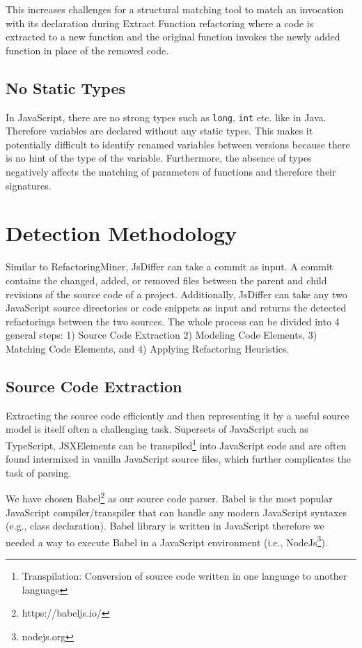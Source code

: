 \documentclass[letterpaper,12pt,onecolumn,final]{report}
\begin{document}
This increases challenges for a structural matching tool to match an invocation with its declaration during Extract Function refactoring where a code is extracted to a new function and the original function invokes the newly added function in place of the removed code.


\subsection {No Static Types}

In JavaScript, there are no strong types such as \texttt{long}, \texttt{int} etc. like in Java. Therefore variables are declared without any static types. This makes it potentially difficult to identify renamed variables between versions because there is no hint of the type of the variable. Furthermore, the absence of types negatively affects the matching of parameters of functions and therefore their signatures.

\section {Detection Methodology}

Similar to RefactoringMiner, JsDiffer can take a commit as input. A commit contains the changed, added, or removed files between the parent and child revisions of the source code of a project. Additionally, JsDiffer can take any two JavaScript source directories or code snippets as input and returns the detected refactorings between the two sources. The whole process can be divided into 4 general steps: 1) Source Code Extraction 2) Modeling Code Elements, 3) Matching Code Elements, and 4) Applying Refactoring Heuristics.


\subsection {Source Code Extraction}
Extracting the source code efficiently and then representing it by a useful source model is itself often a challenging task. Supersets of JavaScript such as TypeScript, JSXElements can be transpiled\footnote{Transpilation: Conversion of source code written in one language to another language} into JavaScript code and are often found intermixed in vanilla JavaScript source files, which further complicates the task of parsing.

We have chosen Babel\footnote{https://babeljs.io/} as our source code parser. Babel is the most popular JavaScript compiler/transpiler that can handle any modern JavaScript syntaxes (e.g., class declaration). Babel library is written in JavaScript therefore we needed a way to execute Babel in a JavaScript environment (i.e., NodeJs\footnote{nodejs.org}).
\end{document}
